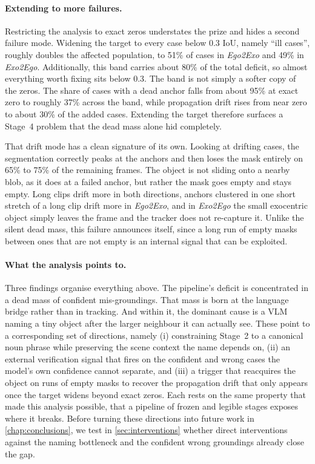 \paragraph{Extending to more failures.}
\label{subsec:ill-cases}

Restricting the analysis to exact zeros understates the prize and hides a second failure mode. Widening the target to every case below 0.3 IoU, namely ``ill cases'', roughly doubles the affected population, to 51\% of cases in \textit{Ego2Exo} and 49\% in \textit{Exo2Ego}. Additionally, this band carries about 80\% of the total deficit, so almost everything worth fixing sits below 0.3. The band is not simply a softer copy of the zeros. The share of cases with a dead anchor falls from about 95\% at exact zero to roughly 37\% across the band, while propagation drift rises from near zero to about 30\% of the added cases. Extending the target therefore surfaces a Stage~4 problem that the dead mass alone hid completely.

That drift mode has a clean signature of its own. Looking at drifting cases, the segmentation correctly peaks at the anchors and then loses the mask entirely on 65\% to 75\% of the remaining frames. The object is not sliding onto a nearby blob, as it does at a failed anchor, but rather the mask goes empty and stays empty. Long clips drift more in both directions, anchors clustered in one short stretch of a long clip drift more in \textit{Ego2Exo}, and in \textit{Exo2Ego} the small exocentric object simply leaves the frame and the tracker does not re-capture it. Unlike the silent dead mass, this failure announces itself, since a long run of empty masks between ones that are not empty is an internal signal that can be exploited.

\paragraph{What the analysis points to.}
\label{subsec:gap-summary}

Three findings organise everything above. The pipeline's deficit is concentrated in a dead mass of confident mis-groundings. That mass is born at the language bridge rather than in tracking. And within it, the dominant cause is a VLM naming a tiny object after the larger neighbour it can actually see. These point to a corresponding set of directions, namely (i) constraining Stage~2 to a canonical noun phrase while preserving the scene context the name depends on, (ii) an external verification signal that fires on the confident and wrong cases the model's own confidence cannot separate, and (iii) a trigger that reacquires the object on runs of empty masks to recover the propagation drift that only appears once the target widens beyond exact zeros. Each rests on the same property that made this analysis possible, that a pipeline of frozen and legible stages exposes where it breaks. Before turning these directions into future work in \cref{chap:conclusions}, we test in \cref{sec:interventions} whether direct interventions against the naming bottleneck and the confident wrong groundings already close the gap.

